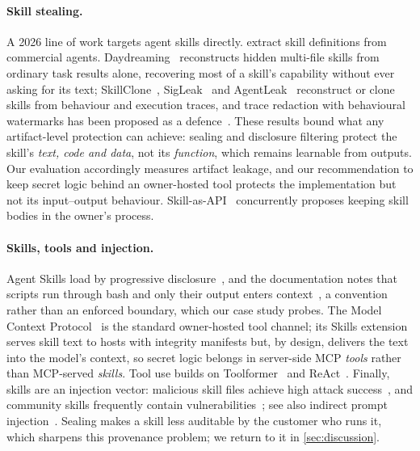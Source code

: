 \paragraph{Skill stealing.}
A 2026 line of work targets agent skills directly. \citet{wang2026blackbox} extract skill
definitions from commercial agents. Daydreaming~\citep{tsai2026daydreaming} reconstructs hidden
multi-file skills from ordinary task results alone, recovering most of a skill's capability without
ever asking for its text; SkillClone~\citep{hua2026behavioral}, SigLeak~\citep{geng2026agent} and
AgentLeak~\citep{lyu2026agentleak} reconstruct or clone skills from behaviour and execution traces,
and trace redaction with behavioural watermarks has been proposed as a
defence~\citep{xu2026redact}. These results bound what any artifact-level protection can achieve:
sealing and disclosure filtering protect the skill's \emph{text, code and data}, not its
\emph{function}, which remains learnable from outputs. Our evaluation accordingly measures artifact
leakage, and our recommendation to keep secret logic behind an owner-hosted tool protects the
implementation but not its input--output behaviour. Skill-as-API~\citep{zhao2026skillasapi}
concurrently proposes keeping skill bodies in the owner's process.

\paragraph{Skills, tools and injection.}
Agent Skills load by progressive disclosure~\citep{anthropic2025skillsblog,agentskills2026spec}, and
the documentation notes that scripts run through bash and only their output enters
context~\citep{anthropic2026skillsdocs}, a convention rather than an enforced boundary, which our
case study probes. The Model Context Protocol~\citep{mcp2026spec} is the standard owner-hosted tool
channel; its Skills extension~\citep{mcp2026skillsext} serves skill text to hosts with integrity
manifests but, by design, delivers the text into the model's context, so secret logic belongs in
server-side MCP \emph{tools} rather than MCP-served \emph{skills}. Tool use builds on
Toolformer~\citep{schick2023toolformer} and ReAct~\citep{yao2023react}. Finally, skills are an
injection vector: malicious skill files achieve high attack success~\citep{schmotz2026skillinject},
and community skills frequently contain vulnerabilities~\citep{xu2026agentskills}; see also indirect
prompt injection~\citep{greshake2023not,liu2024formalizing,zhan2024injecagent,debenedetti2024agentdojo}.
Sealing makes a skill less auditable by the customer who runs it, which sharpens this provenance
problem; we return to it in \cref{sec:discussion}.
